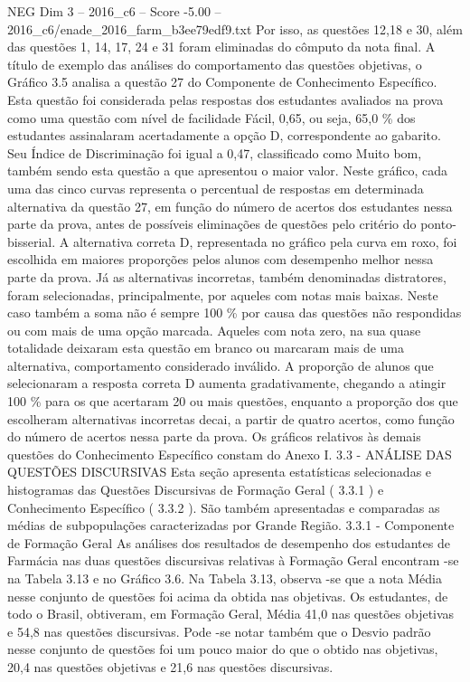 \begin{textsample}{NEG Dim 3 – 2016\_c6 – Score -5.00 – 2016\_c6/enade\_2016\_farm\_b3ee79edf9.txt}
Por isso, as questões 12,18 e 30, além das questões 1, 14, 17, 24 e 31 foram eliminadas do cômputo da nota final.
A título de exemplo das análises do comportamento das questões objetivas, o Gráfico 3.5 analisa a questão 27 do Componente de Conhecimento Específico.
Esta questão foi considerada pelas respostas dos estudantes avaliados na prova como uma questão com nível de facilidade Fácil, 0,65, ou seja, 65,0 \% dos estudantes assinalaram acertadamente a opção D, correspondente ao gabarito.
Seu Índice de Discriminação foi igual a 0,47, classificado como Muito bom, também sendo esta questão a que apresentou o maior valor.
Neste gráfico, cada uma das cinco curvas representa o percentual de respostas em determinada alternativa da questão 27, em função do número de acertos dos estudantes nessa parte da prova, antes de possíveis eliminações de questões pelo critério do ponto-bisserial.
A alternativa correta D, representada no gráfico pela curva em roxo, foi escolhida em maiores proporções pelos alunos com desempenho melhor nessa parte da prova.
Já as alternativas incorretas, também denominadas distratores, foram selecionadas, principalmente, por aqueles com notas mais baixas.
Neste caso também a soma não é sempre 100 \% por causa das questões não respondidas ou com mais de uma opção marcada.
Aqueles com nota zero, na sua quase totalidade deixaram esta questão em branco ou marcaram mais de uma alternativa, comportamento considerado inválido.
A proporção de alunos que selecionaram a resposta correta D aumenta gradativamente, chegando a atingir 100 \% para os que acertaram 20 ou mais questões, enquanto a proporção dos que escolheram alternativas incorretas decai, a partir de quatro acertos, como função do número de acertos nessa parte da prova.
Os gráficos relativos às demais questões do Conhecimento Específico constam do Anexo I. 3.3 - ANÁLISE DAS QUESTÕES DISCURSIVAS Esta seção apresenta estatísticas selecionadas e histogramas das Questões Discursivas de Formação Geral ( 3.3.1 ) e Conhecimento Específico ( 3.3.2 ).
São também apresentadas e comparadas as médias de subpopulações caracterizadas por Grande Região. 3.3.1 - Componente de Formação Geral As análises dos resultados de desempenho dos estudantes de Farmácia nas duas questões discursivas relativas à Formação Geral encontram -se na Tabela 3.13 e no Gráfico 3.6.
Na Tabela 3.13, observa -se que a nota Média nesse conjunto de questões foi acima da obtida nas objetivas.
Os estudantes, de todo o Brasil, obtiveram, em Formação Geral, Média 41,0 nas questões objetivas e 54,8 nas questões discursivas.
Pode -se notar também que o Desvio padrão nesse conjunto de questões foi um pouco maior do que o obtido nas objetivas, 20,4 nas questões objetivas e 21,6 nas questões discursivas.

\end{textsample}
